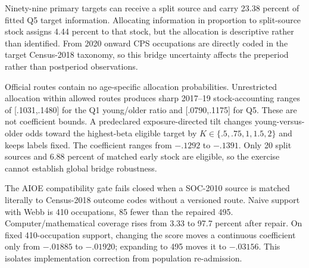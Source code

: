 Ninety-nine primary targets can receive a split source and carry 23.38 percent of fitted Q5 target information. Allocating information in proportion to split-source stock assigns 4.44 percent to that stock, but the allocation is descriptive rather than identified. From 2020 onward CPS occupations are directly coded in the target Census-2018 taxonomy, so this bridge uncertainty affects the preperiod rather than postperiod observations.

Official routes contain no age-specific allocation probabilities. Unrestricted allocation within allowed routes produces sharp 2017--19 stock-accounting ranges of [.1031,.1480] for the Q1 young/older ratio and [.0790,.1175] for Q5. These are not coefficient bounds. A predeclared exposure-directed tilt changes young-versus-older odds toward the highest-beta eligible target by $K\in\{.5,.75,1,1.5,2\}$ and keeps labels fixed. The coefficient ranges from $-.1292$ to $-.1391$. Only 20 split sources and 6.88 percent of matched early stock are eligible, so the exercise cannot establish global bridge robustness.

The AIOE compatibility gate fails closed when a SOC-2010 source is matched literally to Census-2018 outcome codes without a versioned route. Naive support with Webb is 410 occupations, 85 fewer than the repaired 495. Computer/mathematical coverage rises from 3.33 to 97.7 percent after repair. On fixed 410-occupation support, changing the score moves a continuous coefficient only from $-.01885$ to $-.01920$; expanding to 495 moves it to $-.03156$. This isolates implementation correction from population re-admission.
\FloatBarrier
